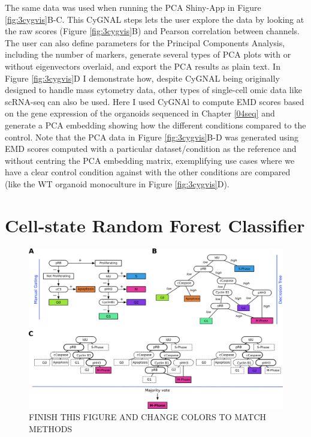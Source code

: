 The same data was used when running the PCA Shiny-App in Figure \ref{fig:3cygvis}B-C. This CyGNAL steps lets the user explore the data by looking at the raw scores (Figure \ref{fig:3cygvis}B) and Pearson correlation between channels. The user can also define parameters for the Principal Components Analysis, including the number of markers, generate several types of PCA plots with or without eigenvectors overlaid, and export the PCA results as plain text. In Figure \ref{fig:3cygvis}D I demonstrate how, despite CyGNAL being originally designed to handle mass cytometry data, other types of single-cell omic data like scRNA-seq can also be used. Here I used CyGNAl to compute EMD scores based on the gene expression of the organoids sequenced in Chapter \ref{04seq} and generate a PCA embedding showing how the different conditions compared to the control.
Note that the PCA data in Figure \ref{fig:3cygvis}B-D was generated using EMD scores computed with a particular dataset/condition as the reference and without centring the PCA embedding matrix, exemplifying use cases where we have a clear control condition against with the other conditions are compared (like the WT organoid monoculture in Figure \ref{fig:3cygvis}D).

\newpage
\section{Cell-state Random Forest Classifier}

\begin{figure}
    \centering
    \includegraphics{03cytof/figs/3CLASS_stateRF.png}
    \caption{FINISH THIS FIGURE AND CHANGE COLORS TO MATCH METHODS}
    \label{fig:3classover}
\end{figure}

